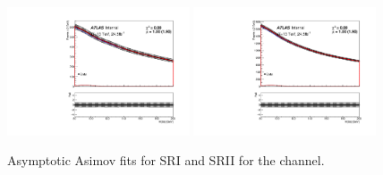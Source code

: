 \begin{figure}[htbp]
  \centering
 \includegraphics[width=0.48\textwidth]{figures/VBF/Asimov_testVBF_ICHEP_2cen_SRI.pdf}
 \includegraphics[width=0.48\textwidth]{figures/VBF/Asimov_testVBF_ICHEP_2cen_SRII.pdf}\\
\caption{Asymptotic Asimov fits for SRI and SRII for the \twocentral channel.}
  \label{fig:2cenAsimov}
\end{figure}

